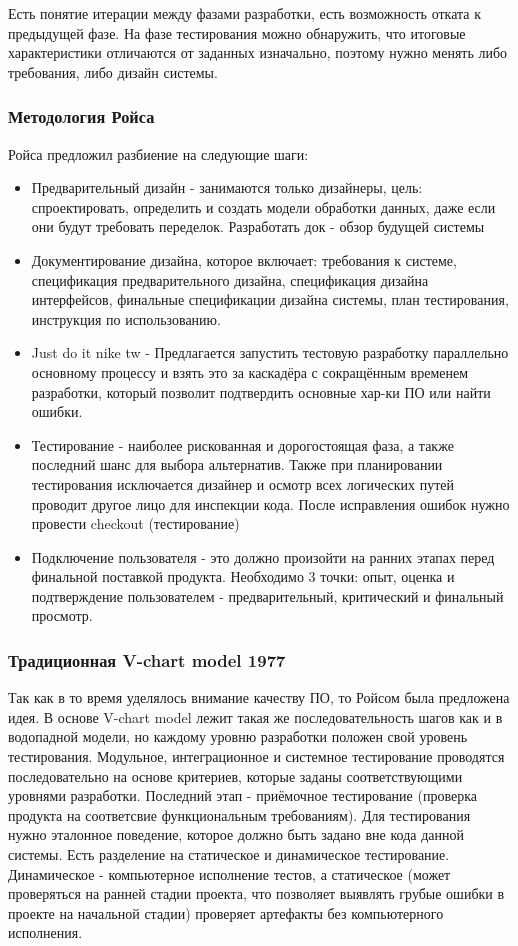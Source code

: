 Есть понятие итерации между фазами разработки, есть возможность отката к предыдущей фазе. 
На фазе тестирования можно обнаружить, что итоговые характеристики отличаются от заданных изначально, поэтому нужно менять либо требования, либо дизайн системы. 

\subsubsection{Методология Ройса}
Ройса предложил разбиение на следующие шаги:
\begin{itemize}
    \item Предварительный дизайн - занимаются только дизайнеры, цель: спроектировать, определить и создать модели обработки данных, даже если они будут требовать переделок. Разработать док - обзор будущей системы
    \item Документирование дизайна, которое включает: требования к системе, спецификация предварительного
    дизайна, спецификация дизайна интерфейсов, финальные спецификации дизайна системы, план
    тестирования, инструкция по использованию.
    \item Just do it nike tw - Предлагается запустить тестовую разработку параллельно основному процессу и взять это за каскадёра с сокращённым временем разработки, который позволит подтвердить основные хар-ки ПО или найти ошибки. 
    \item Тестирование - наиболее рискованная и дорогостоящая фаза, а также последний шанс для выбора альтернатив. Также при планировании тестирования исключается дизайнер и осмотр всех логических путей проводит другое лицо для инспекции кода. После исправления ошибок нужно провести checkout (тестирование)
    \item Подключение пользователя - это должно произойти на ранних этапах перед финальной поставкой продукта. Необходимо 3 точки: опыт, оценка и подтверждение пользователем - предварительный, критический и финальный просмотр.
\end{itemize}

\subsubsection{Традиционная V-chart model 1977}
Так как в то время уделялось внимание качеству ПО, то Ройсом была предложена идея. В основе V-chart model лежит такая же последовательность шагов как и в водопадной модели, но каждому уровню разработки положен свой уровень тестирования. Модульное, интеграционное и системное тестирование проводятся последовательно на основе критериев, которые заданы соответствующими уровнями разработки. Последний этап - приёмочное тестирование (проверка продукта на соответсвие функциональным требованиям).
Для тестирования нужно эталонное поведение, которое должно быть задано вне кода данной системы.
Есть разделение на статическое и динамическое тестирование. Динамическое - компьютерное исполнение тестов, а статическое (может проверяться на ранней стадии проекта, что позволяет выявлять грубые ошибки в проекте на начальной стадии) проверяет артефакты без компьютерного исполнения. 

